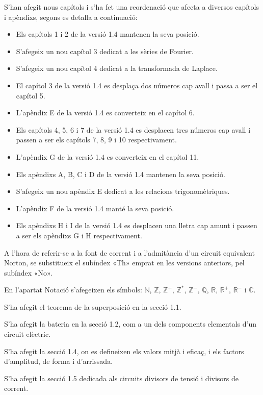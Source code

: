 S'han afegit nous capítols i s'ha fet una reordenació que afecta a
diversos capítols i apèndixs, segons es detalla a continuació:
\begin{itemize}
   \item Els capítols 1 i 2  de la versió 1.4 mantenen la seva posició.
   \item S'afegeix un nou capítol 3 dedicat a les sèries de Fourier.
   \item S'afegeix un nou capítol 4 dedicat a la transformada de Laplace.
   \item El capítol 3 de la versió 1.4 es desplaça dos números cap
    avall i passa a ser el capítol 5.
   \item L'apèndix E de la versió 1.4 es converteix en el capítol 6.
   \item Els capítols 4, 5, 6 i 7  de la versió 1.4 es desplacen tres números cap
    avall i passen a ser els capítols 7, 8, 9 i 10 respectivament.
    \item L'apèndix G de la versió 1.4 es converteix en el capítol 11.
    \item Els apèndixs A, B, C i D de la versió 1.4 mantenen la seva posició.
    \item S'afegeix un nou apèndix E dedicat a les relacions trigonomètriques.
    \item L'apèndix F de la versió 1.4 manté la seva posició.
    \item Els apèndixs H i I de la versió 1.4 es desplacen una lletra cap
    amunt i passen a ser els apèndixs G i H respectivament.
\end{itemize}


 A l'hora de referir-se a la font de corrent i a l'admitància d'un circuit equivalent
 Norton, se substitueix el subíndex «Th» emprat en les versions
anteriors, pel subíndex «No».

En l'apartat Notació s'afegeixen els símbols: $\mathbb{N}$,
$\mathbb{Z}$, $\mathbb{Z}^+$,  $\mathbb{Z}^*$, $\mathbb{Z}^-$,
$\mathbb{Q}$, $\mathbb{R}$, $\mathbb{R}^+$, $\mathbb{R}^-$ i
$\mathbb{C}$.

S'ha afegit el teorema de la superposició en la secció 1.1.


S'ha afegit la bateria en la secció 1.2, com a un
dels components elementals d'un circuit elèctric.

S'ha afegit la secció 1.4, on es defineixen els
valors mitjà i eficaç, i els factors d'amplitud, de forma i
d'arrissada.

S'ha afegit la secció 1.5 dedicada als
circuits divisors de tensió i divisors de corrent.

